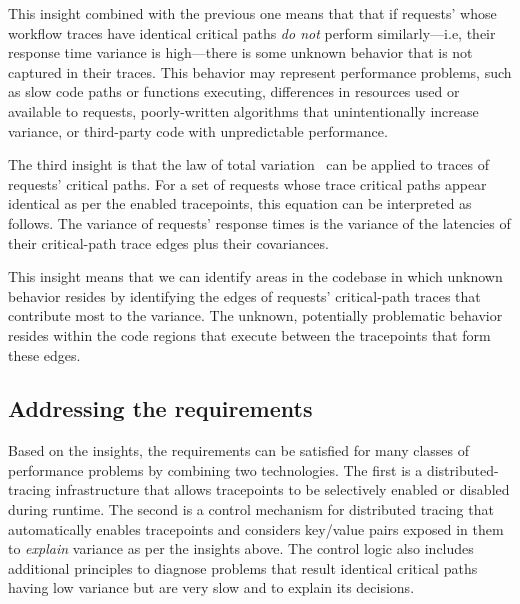 This insight combined with the previous one means that that if
requests' whose workflow traces have identical critical paths
\textit{do not} perform similarly---i.e, their response time variance
is high---there is some unknown behavior that is not captured in their
traces.  This behavior may represent performance problems, such as
slow code paths or functions executing, differences in resources used
or available to requests, poorly-written algorithms that
unintentionally increase variance, or third-party code with
unpredictable performance.


The third insight is that the law of total
variation~\cite{stats_textbook} can be applied to traces of requests'
critical paths.  For a set of requests whose trace critical paths
appear identical as per the enabled tracepoints, this equation can be
interpreted as follows.  The variance of requests' response times is
the variance of the latencies of their critical-path trace edges plus
their covariances.


This insight means that we can identify areas in the codebase in which
unknown behavior resides by identifying the edges of requests'
critical-path traces that contribute most to the variance.  The
unknown, potentially problematic behavior resides within the code
regions that execute between the tracepoints that form these edges.



\subsection{Addressing the requirements}
\label{sec:motivation:guiding_principles}

Based on the insights, the requirements can be satisfied for many
classes of performance problems by combining two technologies.  The
first is a distributed-tracing infrastructure that allows tracepoints
to be selectively enabled or disabled during runtime.  The second is a
control mechanism for distributed tracing that automatically enables
tracepoints and considers key/value pairs exposed in them
to \textit{explain} variance as per the insights above.  
The control logic also includes additional principles to diagnose problems that result
identical critical paths having low variance but are very slow and to
explain its decisions.

